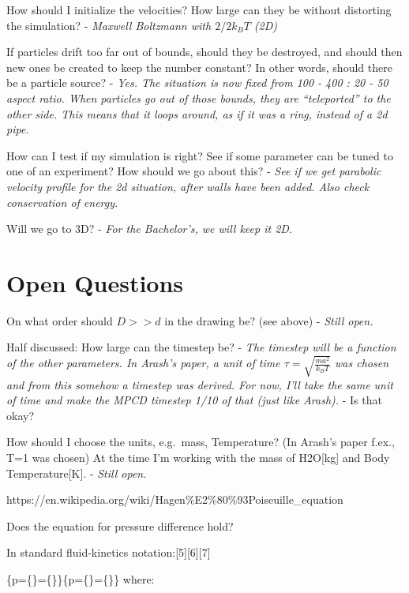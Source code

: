 \documentclass[
]{article}
\begin{document}
How should I initialize the velocities? How large can they be without
distorting the simulation? - \emph{Maxwell Boltzmann with \(2/2 k_B T\)
(2D)}

If particles drift too far out of bounds, should they be destroyed, and
should then new ones be created to keep the number constant? In other
words, should there be a particle source? - \emph{Yes. The situation is
now fixed from 100 - 400 : 20 - 50 aspect ratio. When particles go out
of those bounds, they are ``teleported'' to the other side. This means
that it loops around, as if it was a ring, instead of a 2d pipe.}

How can I test if my simulation is right? See if some parameter can be
tuned to one of an experiment? How should we go about this? - \emph{See
if we get parabolic velocity profile for the 2d situation, after walls
have been added. Also check conservation of energy.}

Will we go to 3D? - \emph{For the Bachelor's, we will keep it 2D.}

\hypertarget{open-questions}{%
\section{Open Questions}\label{open-questions}}

On what order should \(D >> d\) in the drawing be? (see above) -
\emph{Still open.}

Half discussed: How large can the timestep be? - \emph{The timestep will
be a function of the other parameters. In Arash's paper, a unit of time
\(\tau = \sqrt{\frac{m a^2}{k_B T}}\) was chosen and from this somehow a
timestep was derived. For now, I'll take the same unit of time and make
the MPCD timestep 1/10 of that (just like Arash).} - Is that okay?

How should I choose the units, e.g.~mass, Temperature? (In Arash's paper
f.ex., T=1 was chosen) At the time I'm working with the mass of
H2O{[}kg{]} and Body Temperature{[}K{]}. - \emph{Still open.}

https://en.wikipedia.org/wiki/Hagen\%E2\%80\%93Poiseuille\_equation

Does the equation for pressure difference hold?

In standard fluid-kinetics notation:{[}5{]}{[}6{]}{[}7{]}

\{\displaystyle \Delta p=\{\}=\{\}\}\{\displaystyle \Delta p=\{\}=\{\}\}
where:
\end{document}
